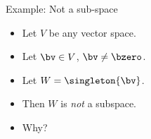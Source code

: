 \documentclass{beamer}
\begin{document}
\begin{frame}{Example: Not a sub-space}

\begin{itemize}
\item Let $V$ be any vector space.
\item Let $\bv\in V$, $\bv\not=\bzero$.
\item Let $W=\singleton{\bv}$.
\item Then $W$ is \emph{not} a subspace.
\item Why?
\end{itemize}
\end{frame}
\end{document}
